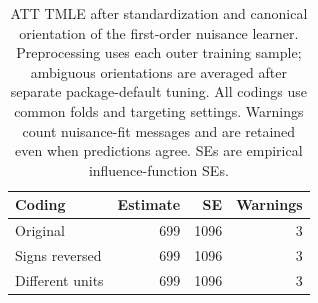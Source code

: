 \begin{table}[ht]
\centering
\small
\caption{ATT TMLE after standardization and canonical orientation
of the first-order nuisance learner. Preprocessing uses each outer
training sample; ambiguous orientations are averaged after separate
package-default tuning. All codings use common folds and targeting
settings. Warnings count nuisance-fit messages and are retained even
when predictions agree. SEs are empirical influence-function SEs.}
\label{tab:causal-canonical}

\begin{tabular}{lrrr}
\toprule
Coding & Estimate & SE & Warnings\\
\midrule
Original & 699 & 1096 & 3\\
Signs reversed & 699 & 1096 & 3\\
Different units & 699 & 1096 & 3\\
\bottomrule
\end{tabular}
\end{table}
